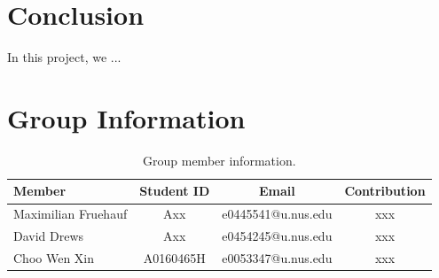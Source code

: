 \documentclass[11pt]{article}
\begin{document}
\section{Conclusion}
In this project, we ...

\section{Group Information}
\begin{table}[ht]
    \centering
    \begin{tabular}{l|c|c|c}
    \hline
     Member & Student ID & Email & Contribution\\
    \hline
    Maximilian Fruehauf& Axx & e0445541@u.nus.edu & xxx \\
    David Drews& Axx &e0454245@u.nus.edu & xxx  \\
    Choo Wen Xin& A0160465H & e0053347@u.nus.edu & xxx  \\
    \hline
    \end{tabular}
    \caption{Group member information.}
    \label{tab:dataset}
\end{table}



 
\end{document}
